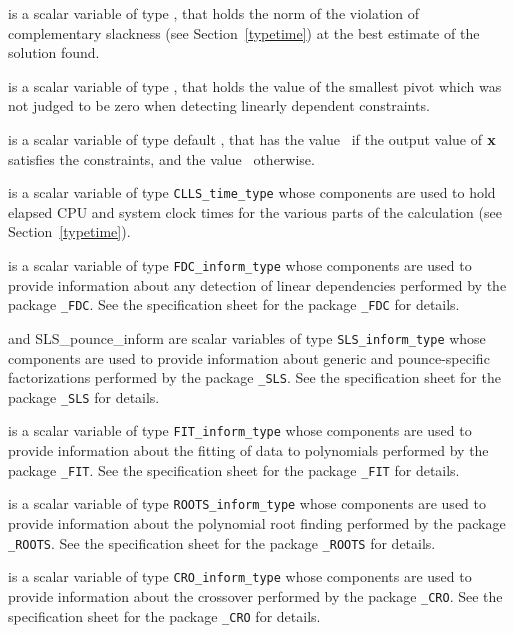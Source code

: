 \documentclass{galahad}
\newcommand{\packagename}{CLLS}
\begin{document}
\begin{description}
is a scalar variable of type \realdp,
that holds the norm of the violation of complementary slackness
(see Section~\ref{typetime}) at the best estimate of the solution found.

is a scalar variable of type \realdp,
that holds the value of the smallest pivot which was not judged to be 
zero when detecting linearly dependent constraints.

 is a scalar variable of type default \logical, that has the
value \true\ if the output value of ${\mathbf{x}}$ satisfies the constraints,
and the value \false\ otherwise.

 is a scalar variable of type {\tt \packagename\_time\_type}
whose components are used to hold elapsed CPU and system clock times for the
various parts of the calculation (see Section~\ref{typetime}).

 is a scalar variable of type
{\tt FDC\_inform\_type}
whose components are used to provide information about
any detection of linear dependencies
performed by the package
{\tt \libraryname\_FDC}.
See the specification sheet for the package
{\tt \libraryname\_FDC} for details.

 and {SLS\_pounce\_inform}
are scalar variables of type {\tt SLS\_inform\_type}
whose components are used to provide information about
generic and pounce-specific factorizations performed by the package
{\tt \libraryname\_SLS}.
See the specification sheet for the package
{\tt \libraryname\_SLS} for details.

 is a scalar variable of type
{\tt FIT\_inform\_type}
whose components are used to provide information about the fitting
of data to polynomials performed by the package
{\tt \libraryname\_FIT}.
See the specification sheet for the package
{\tt \libraryname\_FIT} for details.

 is a scalar variable of type
{\tt ROOTS\_inform\_type}
whose components are used to provide information about the
polynomial root finding performed by the package
{\tt \libraryname\_ROOTS}.
See the specification sheet for the package
{\tt \libraryname\_ROOTS} for details.

 is a scalar variable of type
{\tt CRO\_inform\_type}
whose components are used to provide information about the crossover
performed by the package
{\tt \libraryname\_CRO}.
See the specification sheet for the package
{\tt \libraryname\_CRO} for details.

\end{description}
\end{document}
